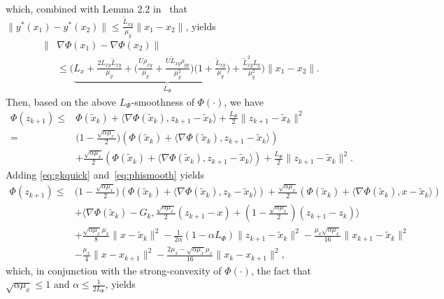 \documentclass{osudissert96}
\begin{document}
which, combined with Lemma 2.2 in~\cite{ghadimi2018approximation} that $\|y^*(x_1)-y^*(x_2)\|\leq \frac{\widetilde L_{xy}}{\mu_y} \|x_1-x_2\|$, yields 
\begin{align}\label{smooth_phi}
\|&\nabla\Phi(x_1) - \nabla\Phi(x_2)\| \nonumber
\\&\leq \Big (\underbrace{L_x+ \frac{2L_{xy}\widetilde L_{xy}}{\mu_y} +\Big(\frac{U\rho_{xy}}{\mu_y}+\frac{U\widetilde L_{xy}\rho_{yy}}{\mu_y^2}\Big)\Big(1+\frac{\widetilde L_{xy}}{\mu_y}\Big)+\frac{\widetilde L^2_{xy}L_y}{\mu^2_y}}_{L_\Phi}\Big) \|x_1-x_2\|.
\end{align}
Then, based on the above $L_\Phi$-smoothness of $\Phi(\cdot)$, we have 
\begin{align}\label{eq:phismooth}
\Phi(z_{k+1}) \leq & \Phi(\widetilde x_k) + \langle \nabla \Phi(\widetilde x_k), z_{k+1}-\widetilde x_k\rangle  + \frac{L_\Phi}{2} \|z_{k+1}-\widetilde x_k\|^2 \nonumber
\\=& \big(1-\frac{\sqrt{\alpha\mu_x}}{2}\big)(\Phi(\widetilde x_k) + \langle \nabla \Phi(\widetilde x_k), z_{k+1}-\widetilde x_k\rangle) \nonumber
\\&+ \frac{\sqrt{\alpha\mu_x}}{2}(\Phi(\widetilde x_k) + \langle \nabla \Phi(\widetilde x_k), z_{k+1}-\widetilde x_k\rangle)+\frac{L_\Phi}{2} \|z_{k+1}-\widetilde x_k\|^2.
\end{align}
Adding \cref{eq:gkquick} and~\cref{eq:phismooth} yields
{\small \begin{align*}
\Phi(z_{k+1})\leq &  \big(1-\frac{\sqrt{\alpha\mu_x}}{2}\big)(\Phi(\widetilde x_k) + \langle \nabla \Phi(\widetilde x_k), z_{k}-\widetilde x_k\rangle) + \frac{\sqrt{\alpha\mu_x}}{2}(\Phi(\widetilde x_k) + \langle \nabla \Phi(\widetilde x_k), x-\widetilde x_k\rangle)  \nonumber
\\&+\big \langle \nabla\Phi(\widetilde x_k)-G_k, \frac{\sqrt{\alpha\mu_x}}{2}(z_{k+1}-x) + (1-\frac{\sqrt{\alpha\mu_x}}{2}) (z_{k+1}-z_k) \big\rangle  \nonumber
\\&+ \frac{\sqrt{\alpha\mu_x}\mu_x}{8}\|x-\widetilde x_k\|^2-\frac{1}{2\alpha}(1-\alpha L_\Phi) \|z_{k+1}-\widetilde x_k\|^2 - \frac{\mu_x\sqrt{\alpha\mu_x}}{16} \|x_{k+1}-\widetilde x_k\|^2\nonumber
\\&-\frac{\mu_x}{4} \|x-x_{k+1}\|^2 -\frac{2\mu_x -\sqrt{\alpha\mu_x}\mu_x}{16} \|x_k-x_{k+1}\|^2,
\end{align*}}
\hspace{-0.13cm}which, in conjunction with the strong-convexity of $\Phi(\cdot)$, the fact that $\sqrt{\alpha \mu_x}\leq 1$ and $\alpha\leq \frac{1}{2L_\Phi}$, yields 
\end{document}

